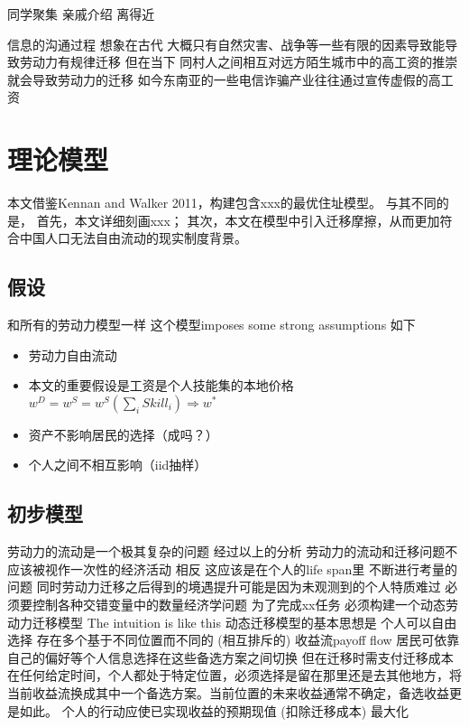 \documentclass[10pt,a4paper]{article}
\begin{document}
同学聚集
亲戚介绍
离得近


信息的沟通过程
想象在古代 大概只有自然灾害、战争等一些有限的因素导致能导致劳动力有规律迁移
但在当下 同村人之间相互对远方陌生城市中的高工资的推崇就会导致劳动力的迁移
如今东南亚的一些电信诈骗产业往往通过宣传虚假的高工资



\section{理论模型}
本文借鉴Kennan and Walker 2011，构建包含xxx的最优住址模型。
与其不同的是，
首先，本文详细刻画xxx；
其次，本文在模型中引入迁移摩擦，从而更加符合中国人口无法自由流动的现实制度背景。

\subsection{假设}
和所有的劳动力模型一样 这个模型imposes some strong assumptions
如下
\begin{itemize}
\item 劳动力自由流动
\item 本文的重要假设是工资是个人技能集的本地价格$w^{D}=w^{S}=w^{S}(\sum\limits_{i}Skill_{i})\Rightarrow w^{*}$
\item 资产不影响居民的选择（成吗？）
\item 个人之间不相互影响（iid抽样）
\end{itemize}


\subsection{初步模型}
劳动力的流动是一个极其复杂的问题
经过以上的分析
劳动力的流动和迁移问题不应该被视作一次性的经济活动
相反
这应该是在个人的life span里
不断进行考量的问题
同时劳动力迁移之后得到的境遇提升可能是因为未观测到的个人特质难过
必须要控制各种交错变量中的数量经济学问题
为了完成xx任务
必须构建一个动态劳动力迁移模型
The intuition is like this
动态迁移模型的基本思想是
个人可以自由选择
存在多个基于不同位置而不同的 (相互排斥的) 收益流payoff flow 
居民可依靠自己的偏好等个人信息选择在这些备选方案之间切换
但在迁移时需支付迁移成本
在任何给定时间，个人都处于特定位置，必须选择是留在那里还是去其他地方，将当前收益流换成其中一个备选方案。当前位置的未来收益通常不确定，备选收益更是如此。
个人的行动应使已实现收益的预期现值 (扣除迁移成本) 最大化
\end{document}
